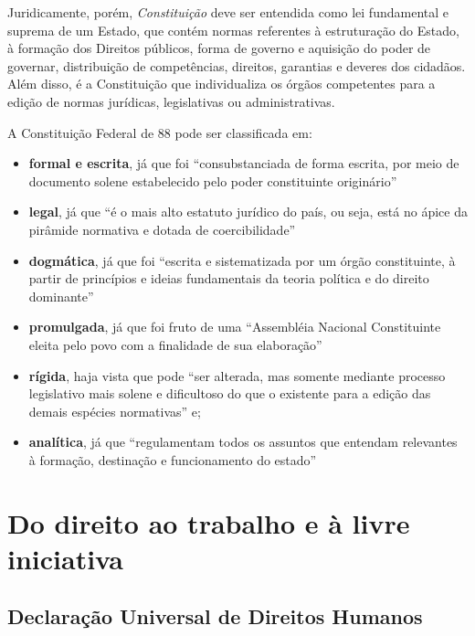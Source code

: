\documentclass[
	10pt,				%
	openright,			%
	twoside,			%
	a5paper,			%
	english,			%
	french,				%
	spanish,			%
	brazil				%
	]{abntex2}
\renewenvironment{quote}
  {\small\list{}{\rightmargin=0.1cm \leftmargin=4cm}%
   \item\relax}
  {\endlist}
\begin{document}
\begin{quote}
Juridicamente, porém, \emph{Constituição} deve ser entendida como lei
fundamental e suprema de um Estado, que contém normas referentes à
estruturação do Estado, à formação dos Direitos públicos, forma de
governo e aquisição do poder de governar, distribuição de competências,
direitos, garantias e deveres dos cidadãos. Além disso, é a Constituição
que individualiza os órgãos competentes para a edição de normas
jurídicas, legislativas ou administrativas.
\end{quote}

A Constituição Federal de 88 pode ser classificada em:

\begin{itemize}
\tightlist
\item
  \textbf{formal e escrita}, já que foi ``consubstanciada de forma
  escrita, por meio de documento solene estabelecido pelo poder
  constituinte originário'' \cite[p.~8]{moraes}
\item
  \textbf{legal}, já que ``é o mais alto estatuto jurídico do país, ou
  seja, está no ápice da pirâmide normativa e dotada de coercibilidade''
  \cite[p.~8]{moraes}
\item
  \textbf{dogmática}, já que foi ``escrita e sistematizada por um órgão
  constituinte, à partir de princípios e ideias fundamentais da teoria
  política e do direito dominante'' \cite[p.~8-9]{moraes}
\item
  \textbf{promulgada}, já que foi fruto de uma ``Assembléia Nacional
  Constituinte eleita pelo povo com a finalidade de sua elaboração''
  \cite[p.~9]{moraes}
\item
  \textbf{rígida}, haja vista que pode ``ser alterada, mas somente
  mediante processo legislativo mais solene e dificultoso do que o
  existente para a edição das demais espécies normativas''
  \cite[p.~9]{moraes} e;
\item
  \textbf{analítica}, já que ``regulamentam todos os assuntos que
  entendam relevantes à formação, destinação e funcionamento do estado''
  \cite[p.~10]{moraes}
\end{itemize}

\section{Do direito ao trabalho e à livre
iniciativa}\label{do-direito-ao-trabalho-e-uxe0-livre-iniciativa}

\subsection{Declaração Universal de Direitos
Humanos}\label{declarauxe7uxe3o-universal-de-direitos-humanos}
\end{document}
